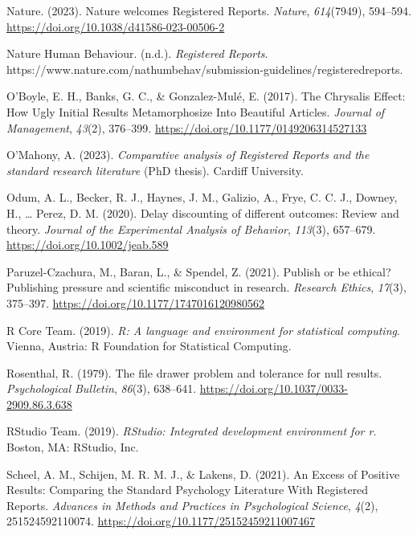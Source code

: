\documentclass[
  ,man,mask,floatsintext]{apa6}
\newlength{\cslhangindent}
\newlength{\cslentryspacingunit} %
\newenvironment{CSLReferences}[2] %
 {%
  \setlength{\parindent}{0pt}
  \ifodd #1
  \let\oldpar\par
  \def\par{\hangindent=\cslhangindent\oldpar}
  \fi
  \setlength{\parskip}{#2\cslentryspacingunit}
 }%
 {}
\begin{document}
\begin{CSLReferences}{1}{0}
\leavevmode{}%
Nature. (2023). Nature welcomes {Registered Reports}. \emph{Nature}, \emph{614}(7949), 594--594. \url{https://doi.org/10.1038/d41586-023-00506-2}

\leavevmode{}%
Nature Human Behaviour. (n.d.). \emph{Registered {Reports}}. https://www.nature.com/nathumbehav/submission-guidelines/registeredreports.

\leavevmode{}%
O'Boyle, E. H., Banks, G. C., \& Gonzalez-Mulé, E. (2017). The {Chrysalis Effect}: {How Ugly Initial Results Metamorphosize Into Beautiful Articles}. \emph{Journal of Management}, \emph{43}(2), 376--399. \url{https://doi.org/10.1177/0149206314527133}

\leavevmode{}%
O'Mahony, A. (2023). \emph{Comparative analysis of {Registered Reports} and the standard research literature} (PhD thesis). Cardiff University.

\leavevmode{}%
Odum, A. L., Becker, R. J., Haynes, J. M., Galizio, A., Frye, C. C. J., Downey, H., \ldots{} Perez, D. M. (2020). Delay discounting of different outcomes: {Review} and theory. \emph{Journal of the Experimental Analysis of Behavior}, \emph{113}(3), 657--679. \url{https://doi.org/10.1002/jeab.589}

\leavevmode{}%
Paruzel-Czachura, M., Baran, L., \& Spendel, Z. (2021). Publish or be ethical? {Publishing} pressure and scientific misconduct in research. \emph{Research Ethics}, \emph{17}(3), 375--397. \url{https://doi.org/10.1177/1747016120980562}

\leavevmode{}%
R Core Team. (2019). \emph{R: {A} language and environment for statistical computing}. Vienna, Austria: R Foundation for Statistical Computing.

\leavevmode{}%
Rosenthal, R. (1979). The file drawer problem and tolerance for null results. \emph{Psychological Bulletin}, \emph{86}(3), 638--641. \url{https://doi.org/10.1037/0033-2909.86.3.638}

\leavevmode{}%
RStudio Team. (2019). \emph{{RStudio}: {Integrated} development environment for r}. Boston, MA: RStudio, Inc.

\leavevmode{}%
Scheel, A. M., Schijen, M. R. M. J., \& Lakens, D. (2021). An {Excess} of {Positive Results}: {Comparing} the {Standard Psychology Literature With Registered Reports}. \emph{Advances in Methods and Practices in Psychological Science}, \emph{4}(2), 251524592110074. \url{https://doi.org/10.1177/25152459211007467}


\end{CSLReferences}
\end{document}
